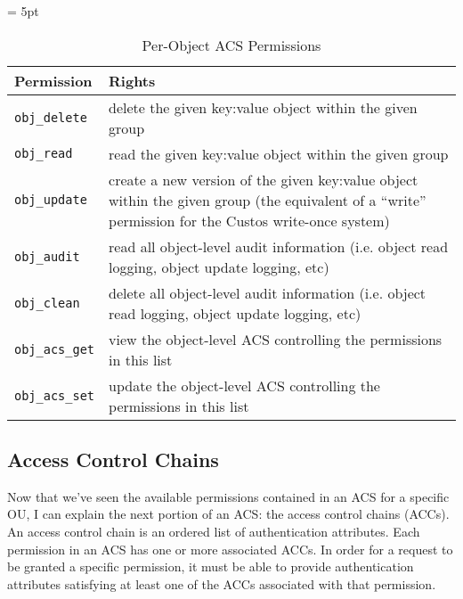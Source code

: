 \begin{table}[!tbh]
  \vspace{1ex}
  \begin{center}
    \tabulinesep = 5pt
    \begin{tabu} to \textwidth
      { | X[1,l,m]
        | X[4,l,m]
        | }
      \hline
      \textbf{Permission}
      & \textbf{Rights}
      \\ \hline
      \texttt{obj\_delete}
      & delete the given key:value object within the given group
      \\ \hline
      \texttt{obj\_read}
      & read the given key:value object within the given group
      \\ \hline
      \texttt{obj\_update}
      & create a new version of the given key:value object within the given group
      \newline
      (the equivalent of a ``write'' permission for the Custos write-once system)
      \\ \hline
      \texttt{obj\_audit}
      & read all object-level audit information
      \newline
      (i.e. object read logging, object update logging, etc)
      \\ \hline
      \texttt{obj\_clean}
      & delete all object-level audit information
      \newline
      (i.e. object read logging, object update logging, etc)
      \\ \hline
      \texttt{obj\_acs\_get}
      & view the object-level ACS controlling the permissions in this list
      \\ \hline
      \texttt{obj\_acs\_set}
      & update the object-level ACS controlling the permissions in this list
      \\ \hline
    \end{tabu}
  \end{center}
  \caption{Per-Object ACS Permissions}
  \label{tab:permissions-object}
\end{table}

\subsection{Access Control Chains}

Now that we've seen the available permissions contained in an ACS for
a specific OU, I can explain the next portion of an ACS: the access
control chains (ACCs). An access control chain is an ordered list of
authentication attributes. Each permission in an ACS has one or more
associated ACCs. In order for a request to be granted a specific
permission, it must be able to provide authentication attributes
satisfying at least one of the ACCs associated with that permission.


